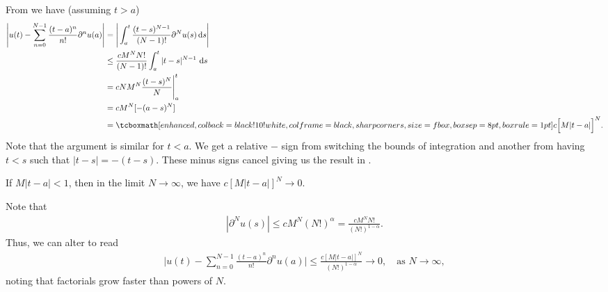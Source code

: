 
From  we have (assuming $t > a$)
\begin{align}
    \label{eq:taylor-series-abs-val}
    \Bigg| u(t) - \sum_{n=0}^{N-1} \frac{(t-a)^{n}}{n!} \partial^{n}u(a) \Bigg| &= \Bigg| \int_{a}^{t} \frac{(t-s)^{N-1}}{(N-1)!} \partial^{N} u(s)\, {\rm d}s \Bigg| \notag \\
    &\leq \frac{c M^{N}N!}{(N-1)!} \int_{a}^{t} |t-s|^{N-1}\, \dd{s} \notag \\
    &= c N M^{N} \frac{(t-s)^{N}}{N}\Bigg|_{a}^{t} \notag \\
    &= c M^{N}[-(a-s)^{N}] \notag\\
    &= \eqbox{c\Big[M|t-a|\Big]^{N}}
.\end{align}
Note that the argument is similar for $t < a$. 
We get a relative $-$ sign from switching the bounds of integration and another from having $t < s$ such that $|t-s| = -(t-s)$.
These minus signs cancel giving us the result in .

If $M|t-a|<1$, then in the limit $N\rightarrow\infty$, we have $c[M|t-a|]^{N} \rightarrow 0$.



Note that
\begin{eqnarray}
    \label{eq:condition-rearrange}
|\partial^{N}u(s)| \leq c M^{N} (N!)^{\alpha} = \frac{c M^{N} N!}{(N!)^{1-\alpha}}
.\end{eqnarray}
Thus, we can alter  to read
\begin{eqnarray}
    \label{eq:taylor-abs-val-3}
    \Bigg| u(t) - \sum_{n=0}^{N-1} \frac{(t-a)^{n}}{n!}\partial^{n}u(a)  \Bigg| \leq \frac{c[M|t-a|]^{N}}{(N!)^{1-\alpha}} \rightarrow 0, \quad \mbox{as } N \rightarrow \infty 
,\end{eqnarray}
noting that factorials grow faster than powers of $N$.

